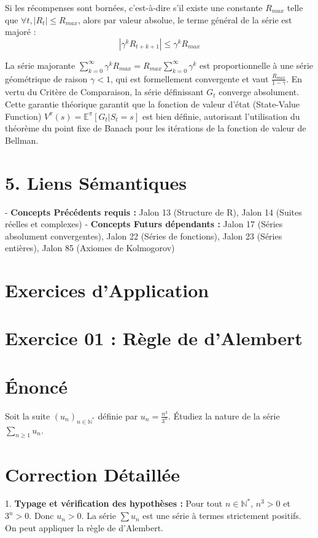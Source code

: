 \documentclass[12pt, a4paper]{article}
\begin{document}
Si les récompenses sont bornées, c'est-à-dire s'il existe une constante $R_{max}$ telle que $\forall t, |R_t| \le R_{max}$, alors par valeur absolue, le terme général de la série est majoré :
$$|\gamma^k R_{t+k+1}| \le \gamma^k R_{max}$$

La série majorante $\sum_{k=0}^\infty \gamma^k R_{max} = R_{max} \sum_{k=0}^\infty \gamma^k$ est proportionnelle à une série géométrique de raison $\gamma < 1$, qui est formellement convergente et vaut $\frac{R_{max}}{1 - \gamma}$.
En vertu du Critère de Comparaison, la série définissant $G_t$ converge absolument. Cette garantie théorique garantit que la fonction de valeur d'état (State-Value Function) $V^\pi(s) = \mathbb{E}^\pi[G_t | S_t = s]$ est bien définie, autorisant l'utilisation du théorème du point fixe de Banach pour les itérations de la fonction de valeur de Bellman.

\section{5. Liens Sémantiques}
- \textbf{Concepts Précédents requis :} Jalon 13 (Structure de R), Jalon 14 (Suites réelles et complexes)
- \textbf{Concepts Futurs dépendants :} Jalon 17 (Séries absolument convergentes), Jalon 22 (Séries de fonctions), Jalon 23 (Séries entières), Jalon 85 (Axiomes de Kolmogorov)


\section{Exercices d'Application}


\section*{Exercice 01 : Règle de d'Alembert}

\section{Énoncé}
Soit la suite $(u_n)_{n \in \mathbb{N}^*}$ définie par $u_n = \frac{n^3}{3^n}$.
Étudiez la nature de la série $\sum_{n \ge 1} u_n$.

\section{Correction Détaillée}
1. \textbf{Typage et vérification des hypothèses :}
   Pour tout $n \in \mathbb{N}^*$, $n^3 > 0$ et $3^n > 0$. Donc $u_n > 0$.
   La série $\sum u_n$ est une série à termes strictement positifs. On peut appliquer la règle de d'Alembert.
\end{document}
